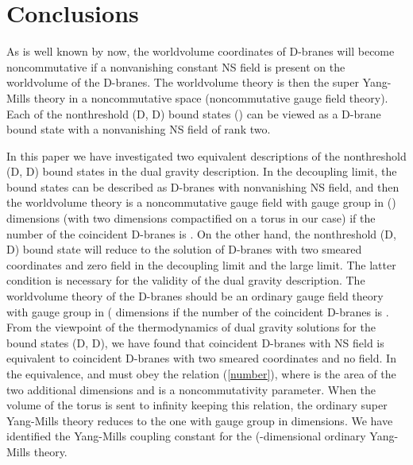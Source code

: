 \documentclass[a4paper,12pt]{article}
\providecommand{\sect}[1]{\setcounter{equation}{0}\section{#1}}
\begin{document}
\sect{Conclusions}

As is well known by now, the worldvolume coordinates of D\coordHE{}-branes will
become noncommutative if a nonvanishing constant NS \coordHE{} field is present
on the worldvolume of the D\coordHE{}-branes. The worldvolume theory is then the
super Yang-Mills theory in a noncommutative space (noncommutative
gauge field theory). Each of the nonthreshold (D\coordHE{}, D\coordHE{}) bound states
(\coordHE{}) can be viewed as a D\coordHE{}-brane bound state with a
nonvanishing NS \coordHE{} field of rank two.

In this paper we have investigated two equivalent descriptions of the
nonthreshold (D\coordHE{}, D\coordHE{}) bound states in the dual gravity description.
In the decoupling limit, the bound states can be described as D\coordHE{}-branes
with nonvanishing NS \coordHE{} field, and then the worldvolume theory is a
noncommutative gauge field with gauge group \coordHE{} in (\coordHE{}) dimensions
(with two dimensions compactified on a torus in our case) if the number of
the coincident D\coordHE{}-branes is \coordHE{}. On the other hand, the nonthreshold
(D\coordHE{}, D\coordHE{}) bound state will reduce to the solution of D\coordHE{}-branes
with two smeared coordinates and zero \coordHE{} field in the decoupling limit and
the large \coordHE{} limit. The latter condition is necessary for the validity
of the dual gravity description. The worldvolume theory of the D\coordHE{}-branes
should be an ordinary gauge field theory with gauge group \coordHE{} in
(\coordHE{} dimensions if the number of the coincident D\coordHE{}-branes is
\coordHE{}. From the viewpoint of the thermodynamics of dual gravity solutions
for the bound states (D\coordHE{}, D\coordHE{}), we have found that \coordHE{} coincident
D\coordHE{}-branes with NS \coordHE{} field is equivalent to \coordHE{} coincident
D\coordHE{}-branes with two smeared coordinates and no \coordHE{} field. In the
equivalence, \coordHE{} and \coordHE{} must obey the relation (\ref{number}),
where \coordHE{} is the area of the two additional dimensions and
\coordHE{} is a noncommutativity parameter. When the volume of the torus is
sent to infinity keeping this relation, the ordinary super Yang-Mills theory
reduces to the one with gauge group \coordHE{} in \coordHE{} dimensions. We
have identified the Yang-Mills coupling constant for the (\coordHE{}-dimensional
ordinary Yang-Mills theory.
\end{document}
